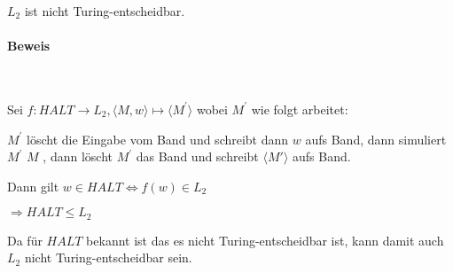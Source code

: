$L_2$ ist nicht Turing-entscheidbar.

\paragraph*{Beweis}~

Sei $f: HALT \to L_2, \langle M, w \rangle \mapsto \langle M^\prime \rangle$ wobei $M^\prime$
wie folgt arbeitet:

$M^\prime$ löscht die Eingabe vom Band und schreibt dann $w$ aufs Band,
dann simuliert $M^\prime$ $M$ , dann löscht $M^\prime$ das Band und schreibt $\langle M' \rangle$ aufs Band.

Dann gilt $w \in HALT \Leftrightarrow f(w) \in L_2$

$\Rightarrow HALT \leq L_2$ 

Da für $HALT$ bekannt ist das es nicht Turing-entscheidbar ist, kann damit auch $L_2$ nicht Turing-entscheidbar sein.  